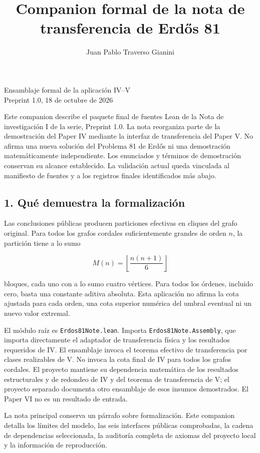 \documentclass[spanish,11pt,a4paper]{article}
\title{Companion formal de la nota de transferencia de Erdős 81}
\author{Juan Pablo Traverso Gianini}
\date{}
\begin{document}
\raggedbottom\maketitle
Ensamblaje formal de la aplicación IV--V\\
Preprint 1.0, 18 de octubre de 2026

Este companion describe el paquete final de fuentes Lean de la Nota de
investigación I de la serie, Preprint 1.0. La nota reorganiza parte de
la demostración del Paper IV mediante la interfaz de transferencia del
Paper V. No afirma una nueva solución del Problema 81 de Erdős ni una
demostración matemáticamente independiente. Los enunciados y términos de
demostración conservan su alcance establecido. La validación actual
queda vinculada al manifiesto de fuentes y a los registros finales
identificados más abajo.

\subsection{1. Qué demuestra la
formalización}\label{quuxe9-demuestra-la-formalizaciuxf3n}

Las conclusiones públicas producen particiones efectivas en cliques del
grafo original. Para todos los grafos cordales suficientemente grandes
de orden \(n\), la partición tiene a lo sumo

\[
M(n)=\left\lfloor\frac{n(n+1)}6\right\rfloor
\]

bloques, cada uno con a lo sumo cuatro vértices. Para todos los órdenes,
incluido cero, basta una constante aditiva absoluta. Esta aplicación no
afirma la cota ajustada para cada orden, una cota superior numérica del
umbral eventual ni un nuevo valor extremal.

El módulo raíz es \nolinkurl{Erdos81Note.lean}. Importa
\nolinkurl{Erdos81Note.Assembly}, que importa directamente el adaptador de
transferencia física y los resultados requeridos de IV. El ensamblaje
invoca el teorema efectivo de transferencia por clases realizables de V.
No invoca la cota final de IV para todos los grafos cordales. El
proyecto mantiene su dependencia matemática de los resultados
estructurales y de redondeo de IV y del teorema de transferencia de V;
el proyecto separado documenta otro ensamblaje de esos insumos
demostrados. El Paper VI no es un resultado de entrada.

La nota principal conserva un párrafo sobre formalización. Este
companion detalla los límites del modelo, las seis interfaces públicas
comprobadas, la cadena de dependencias seleccionada, la auditoría
completa de axiomas del proyecto local y la información de reproducción.
\end{document}
